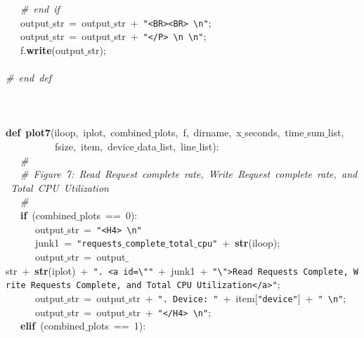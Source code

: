 \mbox{}\ \ \ \textit{\#\ end\ if} \\
\mbox{}\ \ \ output$\_$str\ =\ output$\_$str\ +\ \texttt{"{}\textless{}BR\textgreater{}\textless{}BR\textgreater{}\ \textbackslash{}n"{}}; \\
\mbox{}\ \ \ output$\_$str\ =\ output$\_$str\ +\ \texttt{"{}\textless{}/P\textgreater{}\ \textbackslash{}n\ \textbackslash{}n"{}}; \\
\mbox{}\ \ \ f.\textbf{write}(output$\_$str); \\
\mbox{}\ \ \  \\
\mbox{}\textit{\#\ end\ def} \\
\mbox{} \\
\mbox{} \\
\mbox{} \\
\mbox{}\textbf{def}\ \textbf{plot7}(iloop,\ iplot,\ combined$\_$plots,\ f,\ dirname,\ x$\_$seconds,\ time$\_$sum$\_$list, \\
\mbox{}\ \ \ \ \ \ \ \ \ \ fsize,\ item,\ device$\_$data$\_$list,\ line$\_$list): \\
\mbox{}\ \ \ \textit{\#} \\
\mbox{}\ \ \ \textit{\#\ Figure\ 7:\ Read\ Request\ complete\ rate,\ Write\ Request\ complete\ rate,\ and\ Total\ CPU\ Utilization} \\
\mbox{}\ \ \ \textit{\#} \\
\mbox{}\ \ \ \textbf{if}\ (combined$\_$plots\ ==\ 0): \\
\mbox{}\ \ \ \ \ \ output$\_$str\ =\ \texttt{"{}\textless{}H4\textgreater{}\ \textbackslash{}n"{}} \\
\mbox{}\ \ \ \ \ \ junk1\ =\ \texttt{"{}requests$\_$complete$\_$total$\_$cpu"{}}\ +\ \textbf{str}(iloop); \\
\mbox{}\ \ \ \ \ \ output$\_$str\ =\ output$\_$str\ +\ \textbf{str}(iplot)\ +\ \texttt{"{}.\ \textless{}a\ id=\textbackslash{}"{}"{}}\ +\ junk1\ +\ \texttt{"{}\textbackslash{}"{}\textgreater{}Read\ Requests\ Complete,\ Write\ Requests\ Complete,\ and\ Total\ CPU\ Utilization\textless{}/a\textgreater{}"{}}; \\
\mbox{}\ \ \ \ \ \ output$\_$str\ =\ output$\_$str\ +\ \texttt{"{}.\ Device:\ "{}}\ +\ item[\texttt{"{}device"{}}]\ +\ \texttt{"{}\ \textbackslash{}n"{}}; \\
\mbox{}\ \ \ \ \ \ output$\_$str\ =\ output$\_$str\ +\ \texttt{"{}\textless{}/H4\textgreater{}\ \textbackslash{}n"{}}; \\
\mbox{}\ \ \ \textbf{elif}\ (combined$\_$plots\ ==\ 1): \\
